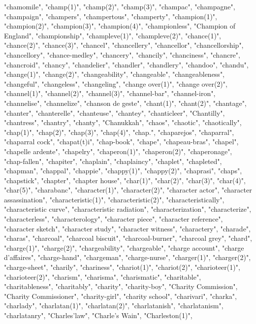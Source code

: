 "chamomile",
"champ(1)",
"champ(2)",
"champ(3)",
"champac",
"champagne",
"champaign",
"champers",
"champertous",
"champerty",
"champion(1)",
"champion(2)",
"champion(3)",
"champion(4)",
"championless",
"Champion of England",
"championship",
"champleve(1)",
"champleve(2)",
"chance(1)",
"chance(2)",
"chance(3)",
"chancel",
"chancellery",
"chancellor",
"chancellorship",
"chancellory",
"chance-medley",
"chancery",
"chancily",
"chanciness",
"chancre",
"chancroid",
"chancy",
"chandelier",
"chandler",
"chandlery",
"chandoo",
"chandu",
"change(1)",
"change(2)",
"changeability",
"changeable",
"changeableness",
"changeful",
"changeless",
"changeling",
"change over(1)",
"change over(2)",
"channel(1)",
"channel(2)",
"channel(3)",
"channel-bar",
"channel-iron",
"channelise",
"channelize",
"chanson de geste",
"chant(1)",
"chant(2)",
"chantage",
"chanter",
"chanterelle",
"chanteuse",
"chantey",
"chanticleer",
"Chantilly",
"chantress",
"chantry",
"chanty",
"Chanukkah",
"chaos",
"chaotic",
"chaotically",
"chap(1)",
"chap(2)",
"chap(3)",
"chap(4)",
"chap.",
"chaparejos",
"chaparral",
"chaparral cock",
"chapat(t)i",
"chap-book",
"chape",
"chapeau-bras",
"chapel",
"chapelle ardente",
"chapelry",
"chaperon(1)",
"chaperon(2)",
"chaperonage",
"chap-fallen",
"chapiter",
"chaplain",
"chaplaincy",
"chaplet",
"chapleted",
"chapman",
"chappal",
"chappie",
"chappy(1)",
"chappy(2)",
"chaprasi",
"chaps",
"chapstick",
"chapter",
"chapter house",
"char(1)",
"char(2)",
"char(3)",
"char(4)",
"char(5)",
"charabanc",
"character(1)",
"character(2)",
"character actor",
"character assassination",
"characteristic(1)",
"characteristic(2)",
"characteristically",
"characteristic curve",
"characteristic radiation",
"characterization",
"characterize",
"characterless",
"characterology",
"character piece",
"character reference",
"character sketch",
"character study",
"character witness",
"charactery",
"charade",
"charas",
"charcoal",
"charcoal biscuit",
"charcoal-burner",
"charcoal grey",
"chard",
"charge(1)",
"charge(2)",
"chargeability",
"chargeable",
"charge account",
"charge d'affaires",
"charge-hand",
"chargeman",
"charge-nurse",
"charger(1)",
"charger(2)",
"charge-sheet",
"charily",
"chariness",
"chariot(1)",
"chariot(2)",
"charioteer(1)",
"charioteer(2)",
"charism",
"charisma",
"charismatic",
"charitable",
"charitableness",
"charitably",
"charity",
"charity-boy",
"Charity Commission",
"Charity Commissioner",
"charity-girl",
"charity school",
"charivari",
"charka",
"charlady",
"charlatan(1)",
"charlatan(2)",
"charlatanish",
"charlatanism",
"charlatanry",
"Charles'law",
"Charle's Wain",
"Charleston(1)",

